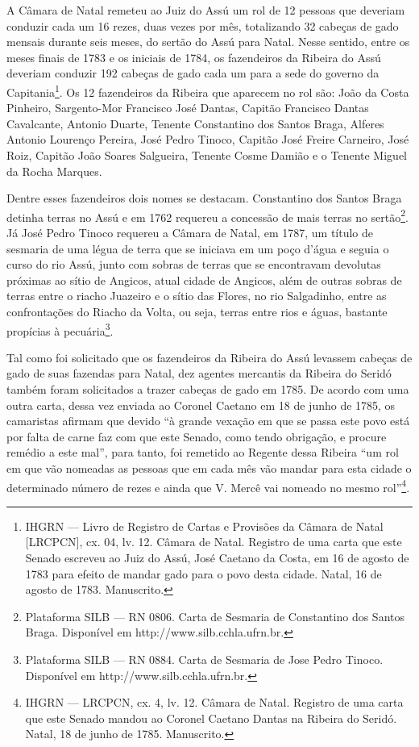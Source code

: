 \begin{refsection}
A Câmara de Natal remeteu ao Juiz do Assú um rol de 12 pessoas que deveriam conduzir cada um 16 rezes, duas vezes por mês, totalizando 32 cabeças de gado mensais durante seis meses, do sertão do Assú para Natal. Nesse sentido, entre os meses finais de 1783 e os iniciais de 1784, os fazendeiros da Ribeira do Assú deveriam conduzir 192 cabeças de gado cada um para a sede do governo da Capitania\footnote{IHGRN --- Livro de Registro de Cartas e Provisões da Câmara de Natal [LRCPCN], cx. 04, lv. 12. Câmara de Natal. Registro de uma carta que este Senado escreveu ao Juiz do Assú, José Caetano da Costa, em 16 de agosto de 1783 para efeito de mandar gado para o povo desta cidade. Natal, 16 de agosto de 1783. Manuscrito.}. Os 12 fazendeiros da Ribeira que aparecem no rol são: João da Costa Pinheiro, Sargento-Mor Francisco José Dantas, Capitão Francisco Dantas Cavalcante, Antonio Duarte, Tenente Constantino dos Santos Braga, Alferes Antonio Lourenço Pereira, José Pedro Tinoco, Capitão José Freire Carneiro, José Roiz, Capitão João Soares Salgueira, Tenente Cosme Damião e o Tenente Miguel da Rocha Marques.

Dentre esses fazendeiros dois nomes se destacam. Constantino dos Santos Braga detinha terras no Assú e em 1762 requereu a concessão de mais terras no sertão\footnote{Plataforma SILB — RN 0806. Carta de Sesmaria de Constantino dos Santos Braga. Disponível em http://www.silb.cchla.ufrn.br.}. Já José Pedro Tinoco requereu a Câmara de Natal, em 1787, um título de sesmaria de uma légua de terra que se iniciava em um poço d’água e seguia o curso do rio Assú, junto com sobras de terras que se encontravam devolutas próximas ao sítio de Angicos, atual cidade de Angicos, além de outras sobras de terras entre o riacho Juazeiro e o sítio das Flores, no rio Salgadinho, entre as confrontações do Riacho da Volta, ou seja, terras entre rios e águas, bastante propícias à pecuária\footnote{Plataforma SILB — RN 0884. Carta de Sesmaria de Jose Pedro Tinoco. Disponível em http://www.silb.cchla.ufrn.br.}.

Tal como foi solicitado que os fazendeiros da Ribeira do Assú levassem cabeças de gado de suas fazendas para Natal, dez agentes mercantis da Ribeira do Seridó também foram solicitados a trazer cabeças de gado em 1785. De acordo com uma outra carta, dessa vez enviada ao Coronel Caetano em 18 de junho de 1785, os camaristas afirmam que devido “à grande vexação em que se passa este povo está por falta de carne faz com que este Senado, como tendo obrigação, e procure remédio a este mal”, para tanto, foi remetido ao Regente dessa Ribeira “um rol em que vão nomeadas as pessoas que em cada mês vão mandar para esta cidade o determinado número de rezes e ainda que V. Mercê vai nomeado no mesmo rol”\footnote{IHGRN --- LRCPCN, cx. 4, lv. 12. Câmara de Natal. Registro de uma carta que este Senado mandou ao Coronel Caetano Dantas na Ribeira do Seridó. Natal, 18 de junho de 1785. Manuscrito.}.


\end{refsection}
